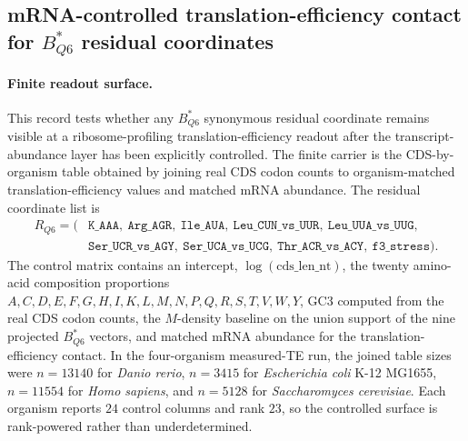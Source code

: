 \subsection{mRNA-controlled translation-efficiency contact for $B^{\ast}_{Q6}$ residual coordinates}
\label{sec:q6-mrna-controlled-translation-efficiency-survival-cross-layer}

\paragraph{Finite readout surface.}
This record tests whether any $B^{\ast}_{Q6}$ synonymous residual coordinate remains visible at a ribosome-profiling translation-efficiency readout after the transcript-abundance layer has been explicitly controlled.  The finite carrier is the CDS-by-organism table obtained by joining real CDS codon counts to organism-matched translation-efficiency values and matched mRNA abundance.  The residual coordinate list is
$$
\begin{aligned}
R_{Q6} = (&\texttt{K\_AAA},\ \texttt{Arg\_AGR},\ \texttt{Ile\_AUA},\ \texttt{Leu\_CUN\_vs\_UUR},\ \texttt{Leu\_UUA\_vs\_UUG},\\
&\texttt{Ser\_UCR\_vs\_AGY},\ \texttt{Ser\_UCA\_vs\_UCG},\ \texttt{Thr\_ACR\_vs\_ACY},\ \texttt{f3\_stress}).
\end{aligned}
$$
The control matrix contains an intercept, $\log(\mathrm{cds\_len\_nt})$, the twenty amino-acid composition proportions $A,C,D,E,F,G,H,I,K,L,M,N,P,Q,R,S,T,V,W,Y$, GC3 computed from the real CDS codon counts, the $M$-density baseline on the union support of the nine projected $B^{\ast}_{Q6}$ vectors, and matched mRNA abundance for the translation-efficiency contact.  In the four-organism measured-TE run, the joined table sizes were $n=13140$ for \textit{Danio rerio}, $n=3415$ for \textit{Escherichia coli} K-12 MG1655, $n=11554$ for \textit{Homo sapiens}, and $n=5128$ for \textit{Saccharomyces cerevisiae}.  Each organism reports $24$ control columns and rank $23$, so the controlled surface is rank-powered rather than underdetermined.

